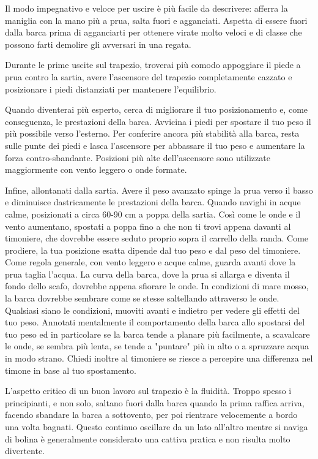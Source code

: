 Il modo impegnativo e veloce per uscire è più facile da descrivere: afferra la
maniglia con la mano più a prua, salta fuori e agganciati. Aspetta di essere
fuori dalla barca prima di agganciarti per ottenere virate molto veloci e di
classe che possono farti demolire gli avversari in una regata.

Durante le prime uscite sul trapezio, troverai più comodo appoggiare il piede a
prua contro la sartia, avere l'ascensore del trapezio completamente cazzato e posizionare
i piedi distanziati per mantenere l'equilibrio.

Quando diventerai più esperto, cerca di migliorare il tuo posizionamento e, come
conseguenza, le prestazioni della barca. Avvicina i piedi per spostare il tuo peso il più
possibile verso l'esterno. Per conferire ancora più stabilità alla barca, resta
sulle punte dei
piedi e lasca l'ascensore per abbassare il tuo peso e aumentare la forza
contro-sbandante.
Posizioni più alte dell'ascensore sono utilizzate maggiormente con
vento leggero o onde formate.

Infine, allontanati dalla sartia. Avere il peso
avanzato spinge la prua verso il basso e diminuisce dastricamente le prestazioni della barca.
Quando navighi in acque calme, posizionati a circa 60-90 cm a poppa della
sartia. Così come le onde e il vento aumentano, spostati a poppa fino a che
non ti trovi appena davanti al timoniere, che dovrebbe essere seduto proprio sopra il
carrello della randa. Come prodiere, la tua posizione esatta dipende
dal tuo peso e dal peso del timoniere. Come regola generale, con vento leggero e
acque calme, guarda avanti dove la prua taglia l'acqua. La curva della barca,
dove la prua si allarga e diventa il fondo dello scafo, dovrebbe appena sfiorare
le onde. In condizioni
di mare mosso, la barca dovrebbe sembrare come se stesse saltellando attraverso
le onde. Qualsiasi siano le condizioni, muoviti avanti e indietro per vedere gli
effetti del tuo peso. Annotati mentalmente il comportamento della barca allo
spostarsi del tuo peso ed in particolare se la barca tende a
planare più facilmente, a scavalcare le onde, se sembra più lenta, se tende a "puntare" più in
alto o a spruzzare acqua in modo strano. Chiedi inoltre al timoniere se
riesce a percepire una differenza nel timone in base al tuo spostamento.

L'aspetto critico di un buon lavoro sul trapezio è la fluidità. Troppo spesso i
principianti, e non solo, saltano fuori dalla barca quando la prima raffica
arriva, facendo sbandare la barca a sottovento, per poi rientrare velocemente a
bordo una volta bagnati. Questo continuo oscillare da un lato all'altro mentre
si naviga di bolina è generalmente considerato una cattiva pratica e non risulta
molto divertente.

